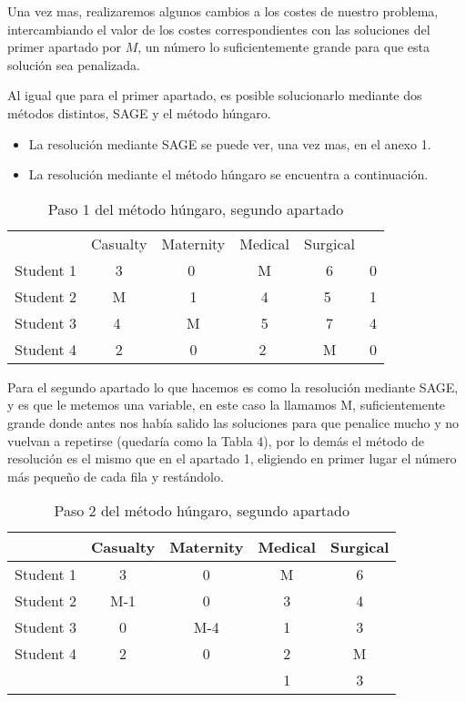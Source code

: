 \documentclass[11pt]{article}
\begin{document}
Una vez mas,  realizaremos algunos cambios a los costes de nuestro problema, intercambiando el valor de los costes correspondientes con las soluciones del primer apartado por $M$, un número lo suficientemente grande para que esta solución sea penalizada.

Al igual que para el primer apartado, es posible solucionarlo mediante dos métodos distintos, SAGE y el método húngaro.

\begin{itemize}
    \item La resolución mediante SAGE se puede ver, una vez mas, en el anexo 1.
    \item La resolución mediante el método húngaro se encuentra a continuación.\\
\end{itemize}

\begin{table}[H]
\centering
\begin{tabular}{lccccl}
\cline{1-5}
 & \multicolumn{1}{l}{Casualty} & \multicolumn{1}{l}{Maternity} & \multicolumn{1}{l}{Medical} & \multicolumn{1}{l}{Surgical} &  \\ \cline{1-5}
Student 1 & 3 & \textcircled{0} & M & 6 & 0 \\
Student 2 & M & 1 & 4 & \textcircled{5} & 1 \\
Student 3 & \textcircled{4} & M & 5 & 7 & 4 \\
Student 4 & 2 & 0 & \textcircled{2} & M & 0 \\ \cline{1-5}
\end{tabular}
\caption{Paso 1 del método húngaro, segundo apartado}
\end{table}

Para el segundo apartado lo que hacemos es como la resolución mediante SAGE, y es que le metemos una variable, en este caso la llamamos M, suficientemente grande donde antes nos había salido las soluciones para que penalice mucho y no vuelvan a repetirse (quedaría como la Tabla 4), por lo demás el método de resolución es el mismo que en el apartado 1, eligiendo en primer lugar el número más pequeño de cada fila y restándolo. 


\begin{table}[H]
\centering
\begin{tabular}{lcccc}
\hline
 & \multicolumn{1}{l}{Casualty} & \multicolumn{1}{l}{Maternity} & \multicolumn{1}{l}{Medical} & \multicolumn{1}{l}{Surgical} \\ \hline
Student 1 & 3 & 0 & M & 6 \\
Student 2 & M-1 & 0 & 3 & 4 \\
Student 3 & 0 & M-4 & 1 & 3 \\
Student 4 & 2 & 0 & 2 & M \\ \hline
& & & 1 & 3
\end{tabular}
\caption{Paso 2 del método húngaro, segundo apartado}
\end{table}
\end{document}
